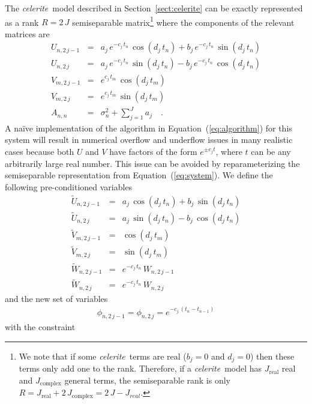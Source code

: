 \documentclass[manuscript, letterpaper]{aastex6}
\newcommand{\celeriteterm}{\emph{celerite}}
\renewcommand{\eqref}[1]{\ref{eq:#1}}
\newcommand{\Eq}[1]{Equation~(\eqref{#1})}
\newcommand{\eq}[1]{\Eq{#1}}
\newcommand{\eqlabel}[1]{\label{eq:#1}}
\newcommand{\sectionname}{Section}
\newcommand{\sectref}[1]{\ref{sect:#1}}
\newcommand{\Sect}[1]{\sectionname~\sectref{#1}}
\newcommand{\sect}[1]{\Sect{#1}}
\begin{document}
The \celeriteterm\ model described in \sect{celerite} can be exactly
represented as a rank $R = 2\,J$ semiseparable matrix\footnote{We note that if
some \celeriteterm\ terms are real ($b_j=0$ and $d_j=0$) then these terms only
add one to the rank.
Therefore, if a \celeriteterm\ model has $J_\mathrm{real}$ real and
$J_\mathrm{complex}$ general terms, the semiseparable rank is only
$R=J_\mathrm{real} + 2\,J_\mathrm{complex}=2\,J-J_{real}$.}
where the components of the relevant matrices are
\begin{eqnarray}\eqlabel{system}
U_{n,2\,j-1} &=& a_j\,e^{-c_j\,t_n}\,\cos(d_j\,t_n) +
    b_j\,e^{-c_j\,t_n}\,\sin(d_j\,t_n) \nonumber\\
U_{n,2\,j} &=& a_j\,e^{-c_j\,t_n}\,\sin(d_j\,t_n) -
    b_j\,e^{-c_j\,t_n}\,\cos(d_j\,t_n) \nonumber\\
V_{m,2\,j-1} &=& e^{c_j\,t_m}\,\cos(d_j\,t_m) \nonumber\\
V_{m,2\,j} &=& e^{c_j\,t_m}\,\sin(d_j\,t_m) \nonumber\\
A_{n,n} &=& \sigma_n^2 + \sum_{j=1}^J a_j \quad.
\end{eqnarray}
A na\"ive implementation of the algorithm in \eq{algorithm} for this system
will result in numerical overflow and underflow issues in many realistic cases
because both $U$ and $V$ have factors of the form $e^{\pm c_j t}$, where $t$
can be any arbitrarily large real number.
This issue can be avoided by reparameterizing the semiseparable representation
from \eq{system}.
We define the following pre-conditioned variables
\begin{eqnarray}\eqlabel{reparam}
\tilde{U}_{n,2\,j-1} &=& a_j\,\cos(d_j\,t_n) + b_j\,\sin(d_j\,t_n) \nonumber\\
\tilde{U}_{n,2\,j} &=& a_j\,\sin(d_j\,t_n) - b_j\,\cos(d_j\,t_n) \nonumber\\
\tilde{V}_{m,2\,j-1} &=& \cos(d_j\,t_m) \nonumber\\
\tilde{V}_{m,2\,j} &=& \sin(d_j\,t_m) \nonumber\\
\tilde{W}_{n,2\,j-1} &=& e^{-c_j\,t_n}\,W_{n,2\,j-1} \nonumber\\
\tilde{W}_{n,2\,j} &=& e^{-c_j\,t_n}\,W_{n,2\,j}
\end{eqnarray}
and the new set of variables
\begin{eqnarray}
\phi_{n,2\,j-1} = \phi_{n,2\,j} = e^{-c_j\,(t_n - t_{n-1})}
\end{eqnarray}
with the constraint
\end{document}

